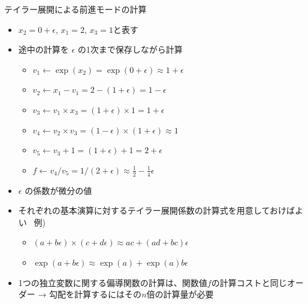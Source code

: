 \begin{frame}[t,fragile]{テイラー展開による前進モードの計算}
  \begin{itemize}
  \item $x_2 = 0 + \epsilon$, $x_1 = 2$, $x_3 = 1$と表す
  \item 途中の計算を $\epsilon$ の1次まで保存しながら計算
    \begin{itemize}
    \item $v_1 \leftarrow \exp(x_2) = \exp(0 + \epsilon) \approx 1 + \epsilon$
    \item $v_2 \leftarrow x_1 - v_1 = 2 - (1 + \epsilon) = 1 - \epsilon$
    \item $v_3 \leftarrow v_1 \times x_3 = (1 + \epsilon) \times 1 = 1 + \epsilon$
    \item $v_4 \leftarrow v_2 \times v_3 = (1 - \epsilon) \times (1 + \epsilon) \approx 1$
    \item $v_5 \leftarrow v_3 + 1 = (1 + \epsilon) + 1 = 2 + \epsilon$
    \item $f \leftarrow v_4 / v_5 = 1 / (2 + \epsilon) \approx \frac{1}{2} - \frac{1}{4} \epsilon$
    \end{itemize}
  \item $\epsilon$ の係数が微分の値
  \item それぞれの基本演算に対するテイラー展開係数の計算式を用意しておけばよい \ 例)
    \begin{itemize}
    \item $(a + b \epsilon) \times (c + d \epsilon) \approx ac + (ad + bc) \epsilon$
    \item $\exp(a+b\epsilon) \approx \exp(a) + \exp(a) b \epsilon$
    \end{itemize}
  \item 1つの独立変数に関する偏導関数の計算は、関数値$f$の計算コストと同じオーダー → 勾配を計算するにはその$n$倍の計算量が必要


\end{itemize}
\end{frame}
